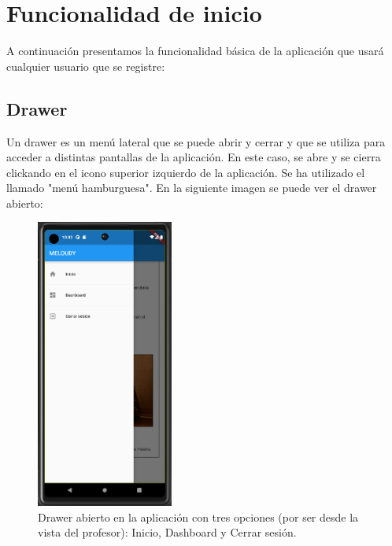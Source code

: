 \newpage
\section{Funcionalidad de inicio}
\label{sec:inicio}
A continuación presentamos la funcionalidad básica de la aplicación que usará cualquier usuario que se registre:




\subsection{Drawer}
Un drawer es un menú lateral que se puede abrir y cerrar y que se utiliza para acceder a distintas pantallas de la aplicación. En este caso, se
abre y se cierra clickando en el icono superior izquierdo de la aplicación. Se ha utilizado el llamado "menú hamburguesa". En la siguiente imagen se puede ver el drawer abierto:

\begin{figure}[H]
    \centering
    \includegraphics[width=0.4\textwidth]{imagenes/c7/drawer.png}
    \caption{Drawer abierto en la aplicación con tres opciones (por ser desde la vista del profesor): Inicio, Dashboard y Cerrar sesión.}
    \label{fig:drawer}
\end{figure}


